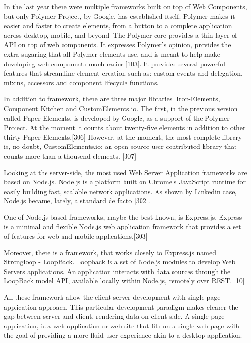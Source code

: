 \documentclass{sig-alternate}
\begin{document}
In the last year there were multiple frameworks built on top of Web Components, but only Polymer-Project, by Google, has established itself. 
Polymer makes it easier and faster to create elements, from a button to a complete application across desktop, mobile, and beyond. 
The Polymer core provides a thin layer of API on top of web components. 
It expresses Polymer's opinion, provides the extra sugaring that all Polymer elements use, and is meant to help make developing web components much easier [103].
It provides several powerful features that streamline element creation such as: custom events and delegation, mixins, accessors and component lifecycle functions.


In addition to framework, there are three major libraries: Iron-Elements, Component Kitchen and CustomElements.io. The first, in the previous version called Paper-Elements, is developed by Google, as a support of the Polymer-Project. At the moment it counts about twenty-five elements in addition to other thirty Paper-Elements.[306]
However, at the moment, the most complete library is, no doubt, CustomElements.io: an open source user-contributed library that counts more than a thousend elements. [307]








Looking at the server-side, the most used Web Server Application frameworks are based on Node.js.
Node.js is a platform built on Chrome's JavaScript runtime for easily building fast, scalable network applications. 
As shown by Linkedin case, Node.js became, lately, a standard de facto [302].




One of Node.js based frameworks, maybe the best-known, is Express.js.
Express is a minimal and flexible Node.js web application framework that provides a set of features for web and mobile applications.[303]




Moreover, there is a framework, that works closely to Express.js named Strongloop - LoopBack.
Loopback is a set of Node.js modules to develop Web Servers applications.
An application interacts with data sources through the LoopBack model API, available locally within Node.js, remotely over REST. [10]




All these framework allow the client-server development with single page application approach. This particular development paradigm makes clearer the gap between server and client, rendering data on client side.
A single-page application, is a web application or web site that fits on a single web page with the goal of providing a more fluid user experience akin to a desktop application.
\end{document}
